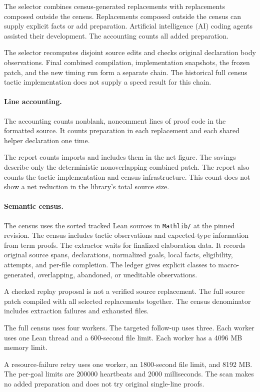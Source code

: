 The selector combines census-generated replacements with replacements composed outside the census.
Replacements composed outside the census can supply explicit facts or add preparation.
Artificial intelligence (AI) coding agents assisted their development.
The accounting counts all added preparation.

The selector recomputes disjoint source edits and checks original declaration body observations.
Final combined compilation, implementation snapshots, the frozen patch, and the new timing run form a separate chain.
The historical full census tactic implementation does not supply a speed result for this chain.

\paragraph{Line accounting.}
The accounting counts nonblank, noncomment lines of proof code in the formatted source.
It counts preparation in each replacement and each shared helper declaration one time.

The report counts imports and includes them in the net figure.
The savings describe only the deterministic nonoverlapping combined patch.
The report also counts the tactic implementation and census infrastructure.
This count does not show a net reduction in the library's total source size.

\paragraph{Semantic census.}
The census uses the sorted tracked Lean sources in \texttt{Mathlib/} at the pinned revision.
The census includes tactic observations and expected-type information from term proofs.
The extractor waits for finalized elaboration data.
It records original source spans, declarations, normalized goals, local facts, eligibility, attempts, and per-file completion.
The ledger gives explicit classes to macro-generated, overlapping, abandoned, or uneditable observations.

A checked replay proposal is not a verified source replacement.
The full source patch compiled with all selected replacements together.
The census denominator includes extraction failures and exhausted files.

The full census uses four workers.
The targeted follow-up uses three.
Each worker uses one Lean thread and a 600-second file limit.
Each worker has a 4096 MB memory limit.

A resource-failure retry uses one worker, an 1800-second file limit, and 8192 MB.
The per-goal limits are 200000 heartbeats and 2000 milliseconds.
The scan makes no added preparation and does not try original single-line proofs.

